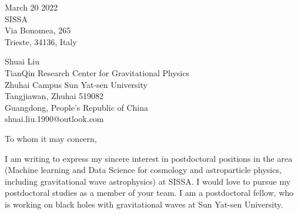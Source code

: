 \documentclass[11pt,a4paper,sans]{letter} %
\date{}
\begin{document}

\begin{letter}{March 20 2022 \\
SISSA \\
Via Bonomea, 265 \\ 
Trieste, 34136, Italy}

Shuai Liu \\
TianQin Research Center for Gravitational Physics \\
Zhuhai Campus Sun Yat-sen University \\
Tangjiawan, Zhuhai 519082 \\
Guangdong, People's Republic of China \\
shuai.liu.1990@outlook.com








\opening{To whom it may concern,} 
 
    I am writing to express my sincere interest in postdoctoral positions in the area (Machine learning and Data Science
    for cosmology and astroparticle physics, including gravitational wave astrophysics) at SISSA. I would love to
pursue my postdoctoral studies as a member of your team. I am a postdoctoral fellow, who is working on black holes with
    gravitational waves at Sun Yat-sen University.


\end{letter}
\end{document}
